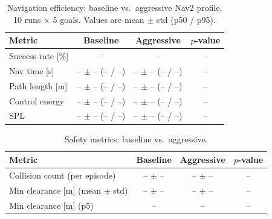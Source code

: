 
\usepackage{booktabs}
\usepackage{multirow}
\usepackage{siunitx}

\begin{table}[t]
\centering
\caption{Navigation efficiency: baseline vs.\ aggressive Nav2 profile.
10 runs $\times$ 5 goals. Values are mean $\pm$ std (p50 / p95).}
\label{tab:nav_efficiency}
\begin{tabular}{lccc}
\toprule
Metric & Baseline & Aggressive & $p$-value \\
\midrule
Success rate [\%]    & -- & -- & -- \\
Nav time [s]         & -- $\pm$ -- (-- / --) & -- $\pm$ -- (-- / --) & -- \\
Path length [m]      & -- $\pm$ -- (-- / --) & -- $\pm$ -- (-- / --) & -- \\
Control energy       & -- $\pm$ -- (-- / --) & -- $\pm$ -- (-- / --) & -- \\
SPL                  & -- $\pm$ -- (-- / --) & -- $\pm$ -- (-- / --) & -- \\
\bottomrule
\end{tabular}
\end{table}

\begin{table}[t]
\centering
\caption{Safety metrics: baseline vs.\ aggressive.}
\label{tab:safety}
\begin{tabular}{lccc}
\toprule
Metric & Baseline & Aggressive & $p$-value \\
\midrule
Collision count (per episode)      & -- $\pm$ -- & -- $\pm$ -- & -- \\
Min clearance [m] (mean $\pm$ std) & -- $\pm$ -- & -- $\pm$ -- & -- \\
Min clearance [m] (p5)             & --           & --           & -- \\
\bottomrule
\end{tabular}
\end{table}

